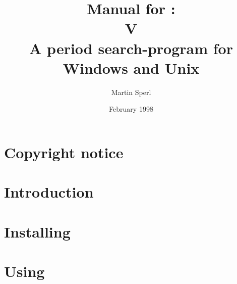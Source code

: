 \title{Manual for \periodname:\\
        V\version\\
        A period search-program for Windows and Unix}
\author{Martin Sperl}
\date{February 1998}

\normskip

\makeindex


\setcounter{secnumdepth}{4}
\setcounter{tocdepth}{4}


\maketitle
\cleardoublepage

\cleardoublepage
\pagestyle{fancyplain}

\myfoot{\thepage}{}{}
\tableofcontents
\cleardoublepage

\cleardoublepage
\chapter*{Copyright notice}%
\label{HELP_COPYRIGHT}

\cleardoublepage

\cleardoublepage
\chapter{Introduction}%
\label{HELP_INTRODUCTION}

\cleardoublepage

\cleardoublepage
\chapter{Installing \periodname}

\cleardoublepage

\cleardoublepage
\chapter{Using \periodname}%
\label{HELP_HOW_TO_USE}

\cleardoublepage

